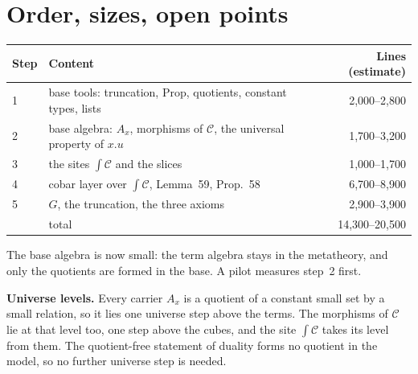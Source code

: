\documentclass[11pt]{amsart}
\theoremstyle{definition}
\theoremstyle{remark}
\newcommand{\Prop}{\mathrm{Prop}}
\newcommand{\tC}{{\textstyle\int}\mathcal C}
\begin{document}
\section{Order, sizes, open points}

\begin{center}
\begin{tabular}{@{}llr@{}}
\toprule
Step & Content & Lines (estimate)\\
\midrule
1 & base tools: truncation, $\Prop$, quotients, constant types, lists & 2{,}000--2{,}800\\
2 & base algebra: $A_x$, morphisms of $\mathcal C$, the universal property of $x.u$ & 1{,}700--3{,}200\\
3 & the sites $\tC$ and the slices & 1{,}000--1{,}700\\
4 & cobar layer over $\tC$, Lemma~59, Prop.~58 & 6{,}700--8{,}900\\
5 & $G$, the truncation, the three axioms & 2{,}900--3{,}900\\
\midrule
& total & 14{,}300--20{,}500\\
\bottomrule
\end{tabular}
\end{center}

\noindent The base algebra is now small: the term algebra stays in the
metatheory, and only the quotients are formed in the base. A pilot
measures step~2 first.

\medskip
\noindent\textbf{Universe levels.} Every carrier $A_x$ is a quotient of a
constant small set by a small relation, so it lies one universe step above
the terms. The morphisms of $\mathcal C$ lie at that level too, one step
above the cubes, and the site $\tC$ takes its level from them. The
quotient-free statement of duality forms no quotient in the model, so no
further universe step is needed.
\end{document}
